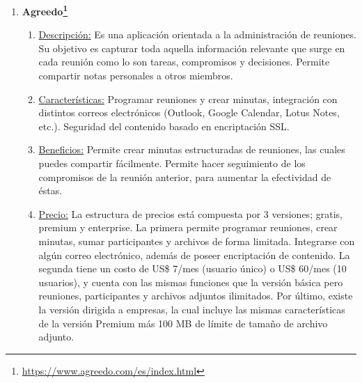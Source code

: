 \begin{enumerate}[1.]
\begin{enumerate}[a]
		\item \underline{Características:} Permite iniciar conversaciones en equipo, sea de forma anónima o no. También permite a los usuarios votar por los comentarios de los demás y filtrar los comentarios basados en estos votos ascendentes. Los usuarios pueden crear encuestas personalizadas para la respuesta del equipo y pueden organizar debates en diferentes grupos. 
	    \item \underline{Beneficios:} Con esta plataforma se puede obtener retroalimentación anónima o no y en línea. Permite destacar las buenas ideas que nacen de los equipos por medio de las votaciones. Este \textit{software} fomenta tener menos reuniones, más efectivas y llegar a decisiones mejores y más informadas.
	    \item \underline{Precio:} Posee versión gratuita para grupos pequeños. Los grupos más grandes requieren una suscripción mensual. Versión gratis: hasta 10 usuarios, 1 GB de almacenamiento, encuestas y discusiones ilimitadas. Si requiere más capacidad tiene un costo de USD\$ 5 por usuario mensual, e incluye usuarios Ilimitados, almacenamiento de 20 GB, encuestas y discusiones ilimitadas. Por último, si aún se requiere mayor capacidad existe la versión a USD\$ 7 por usuarios mensual, que considera usuarios Ilimitados, almacenamiento de 20 GB, encuestas y discusiones ilimitadas.
    \end{enumerate}	    
    \item \textbf{Agreedo\footnote{\url{https://www.agreedo.com/es/index.html}}}
    \begin{enumerate}[a]
	    \item \underline{Descripción:} Es una aplicación orientada a la administración de reuniones. Su objetivo es capturar toda aquella información relevante que surge en cada reunión como lo son tareas, compromisos y decisiones. Permite compartir notas personales a otros miembros. 
		\item \underline{Características:} Programar reuniones y crear minutas, integración con distintos correos electrónicos (Outlook, Google Calendar, Lotus Notes, etc.). Seguridad del contenido basado en encriptación SSL. 
	    \item \underline{Beneficios:} Permite crear minutas estructuradas de reuniones, las cuales puedes compartir fácilmente. Permite hacer seguimiento de los compromisos de la reunión anterior, para aumentar la efectividad de éstas.
	    \item \underline{Precio:} La estructura de precios está compuesta por 3 versiones; gratis, premium y enterprise. La primera permite programar reuniones, crear minutas, sumar participantes y archivos de forma limitada. Integrarse con algún correo electrónico, además de poseer encriptación de contenido. La segunda tiene un costo de US\$ 7/mes (usuario único) o US\$ 60/mes (10 usuarios), y cuenta con las mismas funciones que la versión básica pero reuniones, participantes y archivos adjuntos ilimitados. Por último, existe la versión dirigida a empresas, la cual incluye las mismas características de la versión Premium más 100 MB de límite de tamaño de archivo adjunto.

\end{enumerate}
\end{enumerate}
